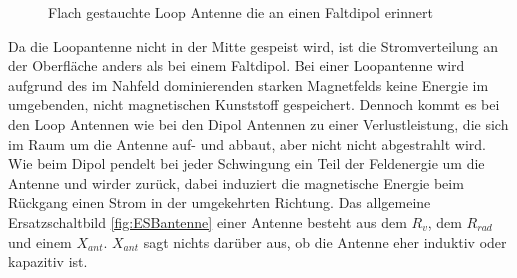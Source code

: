 \begin{figure}[!ht]
	\begin{center}
	\end{center}
\caption{Flach gestauchte Loop Antenne die an einen Faltdipol erinnert}
\label{fig:FflacheLoopAntenne}
\end{figure}
Da die Loopantenne nicht in der Mitte gespeist wird, ist die Stromverteilung an der Oberfläche anders als bei einem Faltdipol. Bei einer Loopantenne wird aufgrund des im Nahfeld dominierenden starken Magnetfelds keine Energie im umgebenden, nicht magnetischen Kunststoff gespeichert. Dennoch kommt es bei den Loop Antennen wie bei den Dipol Antennen zu einer Verlustleistung, die sich im Raum um die Antenne auf- und abbaut, aber nicht nicht abgestrahlt wird. Wie beim Dipol pendelt bei jeder Schwingung ein Teil der Feldenergie um die Antenne und wirder zurück, dabei induziert die magnetische Energie beim Rückgang einen Strom in der umgekehrten Richtung. Das allgemeine Ersatzschaltbild \ref{fig:ESBantenne} einer Antenne besteht aus dem $R_{v}$, dem $R_{rad}$ und einem $X_{ant}$. $X_{ant}$ sagt nichts darüber aus, ob die Antenne eher induktiv oder kapazitiv ist. 



